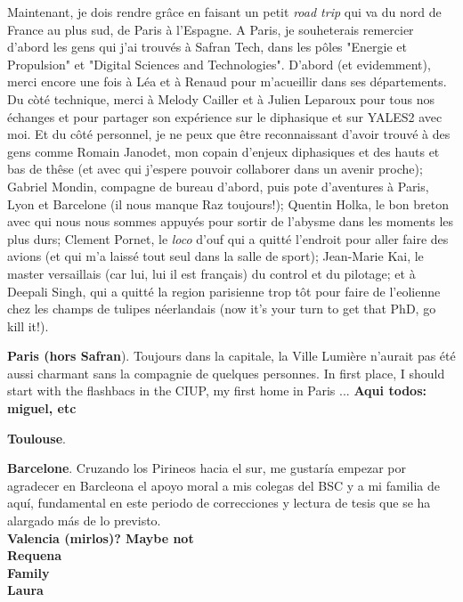Maintenant, je dois rendre grâce en faisant un petit \textsl{road trip} qui va du nord de France au plus sud, de Paris à l'Espagne. A Paris, je souheterais remercier d'abord les gens qui j'ai trouvés à Safran Tech, dans les pôles "Energie et Propulsion" et "Digital Sciences and Technologies". D'abord (et evidemment), merci encore une fois à Léa et à Renaud pour m'acueillir dans ses départements. Du còté technique, merci à Melody Cailler et à Julien Leparoux pour tous nos échanges et pour partager son expérience sur le diphasique et sur YALES2 avec moi.  Et du côté personnel, je ne peux que être reconnaissant d'avoir trouvé à des gens comme Romain Janodet, mon copain d'enjeux diphasiques et des hauts et bas de thêse (et avec qui j'espere pouvoir collaborer dans un avenir proche); Gabriel Mondin, compagne de bureau d'abord, puis pote d'aventures à Paris, Lyon et Barcelone (il nous manque Raz toujours!); Quentin Holka, le bon breton avec qui nous nous sommes appuyés pour sortir de l'abysme dans les moments les plus durs; Clement Pornet, le \textsl{loco} d'ouf qui a quitté l'endroit pour aller faire des avions (et qui m'a laissé tout seul dans la salle de sport); Jean-Marie Kai, le master versaillais (car lui, lui il est français) du control et du pilotage; et à Deepali Singh, qui a quitté la region parisienne trop tôt pour faire de l'eolienne chez les champs de tulipes néerlandais (now it's your turn to get that PhD, go kill it!).
  
\textbf{Paris (hors Safran}).  Toujours dans la capitale, la Ville Lumière n'aurait pas été aussi charmant sans la compagnie de quelques personnes. In first place, I should start with the flashbacs in the CIUP, my first home in Paris ... \textbf{Aqui todos: miguel, etc}



\textbf{Toulouse}. 

\textbf{Barcelone}. Cruzando los Pirineos hacia el sur, me gustaría empezar por agradecer en Barcleona el apoyo moral a mis colegas del BSC y a mi familia de aquí, fundamental en este periodo de correcciones y lectura de tesis que se ha alargado más de lo previsto. \\ 


\textbf{Valencia (mirlos)? Maybe not} \\


\textbf{Requena} \\


\textbf{Family} \\


\textbf{Laura}


%

